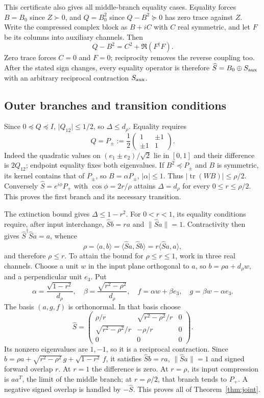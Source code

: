 \documentclass[11pt,a4paper]{article}
\theoremstyle{remark}
\newcommand{\norm}[1]{\lVert #1\rVert}
\newcommand{\abs}[1]{\lvert #1\rvert}
\newcommand{\ip}[2]{\langle #1,#2\rangle}
\newcommand{\tr}{\operatorname{tr}}
\begin{document}
This certificate also gives all middle-branch equality cases. Equality forces $B=B_0$ since $Z\succ0$, and $Q=B_0^2$ since $Q-B^2\succeq0$ has zero trace against $Z$. Write the compressed complex block as $B+iC$ with $C$ real symmetric, and let $F$ be its columns into auxiliary channels. Then
\[
 Q-B^2=C^2+\Re(F^\dagger F).
\]
Zero trace forces $C=0$ and $F=0$; reciprocity removes the reverse coupling too. After the stated sign changes, every equality operator is therefore $\widehat S=B_0\oplus S_{\rm aux}$ with an arbitrary reciprocal contraction $S_{\rm aux}$.

\subsection{Outer branches and transition conditions}
Since $0\preceq Q\preceq I$, $\abs{Q_{12}}\leq1/2$, so $\Delta\leq d_\rho$. Equality requires
\[
 Q=P_\pm:=\frac12\begin{pmatrix}1&\pm1\\\pm1&1\end{pmatrix}.
\]
Indeed the quadratic values on $(e_1\pm e_2)/\sqrt2$ lie in $[0,1]$ and their difference is $2Q_{12}$; endpoint equality fixes both eigenvalues. If $B^2\preceq P_\pm$ and $B$ is symmetric, its kernel contains that of $P_\pm$, so $B=\alpha P_\pm$, $\abs\alpha\leq1$. Thus $\abs{\tr(WB)}\leq\rho/2$. Conversely $\widehat S=e^{i\phi}P_+$ with $\cos\phi=2r/\rho$ attains $\Delta=d_\rho$ for every $0\leq r\leq\rho/2$. This proves the first branch and its necessary transition.

The extinction bound gives $\Delta\leq1-r^2$. For $0<r<1$, its equality conditions require, after input interchange, $\widehat Sb=ra$ and $\norm{\widehat Sa}=1$. Contractivity then gives $\widehat S^\dagger\widehat Sa=a$, whence
\[
 \rho=\ip ab=\ip{\widehat Sa}{\widehat Sb}
 =r\ip{\widehat Sa}a,
\]
and therefore $\rho\leq r$. To attain the bound for $\rho\leq r\leq1$, work in three real channels. Choose a unit $w$ in the input plane orthogonal to $a$, so $b=\rho a+d_\rho w$, and a perpendicular unit $e_3$. Put
\[
 \alpha=\frac{\sqrt{1-r^2}}{d_\rho},\quad
 \beta=\frac{\sqrt{r^2-\rho^2}}{d_\rho},\quad
 f=\alpha w+\beta e_3,\quad g=\beta w-\alpha e_3.
\]
The basis $(a,g,f)$ is orthonormal. In that basis choose
\[
 \widehat S=\begin{pmatrix}\rho/r&\sqrt{r^2-\rho^2}/r&0\\
 \sqrt{r^2-\rho^2}/r&-\rho/r&0\\0&0&0\end{pmatrix}.
\]
Its nonzero eigenvalues are $1,-1$, so it is a reciprocal contraction. Since $b=\rho a+\sqrt{r^2-\rho^2}\,g+\sqrt{1-r^2}\,f$, it satisfies $\widehat Sb=ra$, $\norm{\widehat Sa}=1$ and signed forward overlap $r$. At $r=1$ the difference is zero. At $r=\rho$, its input compression is $aa^T$, the limit of the middle branch; at $r=\rho/2$, that branch tends to $P_+$. A negative signed overlap is handled by $-\widehat S$. This proves all of Theorem~\ref{thm:joint}.
\end{document}
